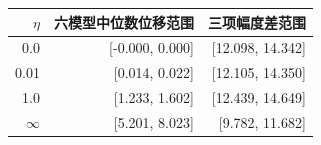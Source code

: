 \begin{tabular}{rrr}
\toprule
$\eta$ & 六模型中位数位移范围 & 三项幅度差范围 \\
\midrule
0.0 & [-0.000, 0.000] & [12.098, 14.342] \\
0.01 & [0.014, 0.022] & [12.105, 14.350] \\
1.0 & [1.233, 1.602] & [12.439, 14.649] \\
$\infty$ & [5.201, 8.023] & [9.782, 11.682] \\
\bottomrule
\end{tabular}

